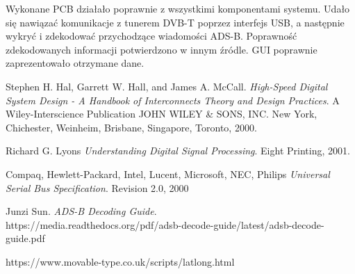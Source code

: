 \documentclass[eng,printmode]{mgr}
\begin{document}
Wykonane PCB działało poprawnie z wszystkimi komponentami systemu. Udało się nawiązać komunikacje z tunerem DVB-T poprzez interfejs USB, a następnie wykryć i zdekodować przychodzące wiadomości ADS-B. Poprawność zdekodowanych informacji potwierdzono w innym źródle. GUI poprawnie zaprezentowało otrzymane dane.


\begin{thebibliography}{9}
Stephen H. Hal, Garrett W. Hall, and James A. McCall. 
\textit{High-Speed Digital System Design - A Handbook of Interconnects Theory and Design Practices}.
A Wiley-Interscience Publication JOHN WILEY \& SONS, INC.
New York, Chichester, Weinheim, Brisbane, Singapore, Toronto, 2000.

Richard G. Lyons
\textit{Understanding Digital Signal Processing}.
Eight Printing, 2001.

Compaq,
Hewlett-Packard,
Intel,
Lucent,
Microsoft,
NEC,
Philips
\textit{Universal Serial Bus Specification}.
Revision 2.0,
2000

Junzi Sun. 
\textit{ADS-B Decoding Guide}.\\
https://media.readthedocs.org/pdf/adsb-decode-guide/latest/adsb-decode-guide.pdf

https://www.movable-type.co.uk/scripts/latlong.html

\end{thebibliography}
\end{document}
